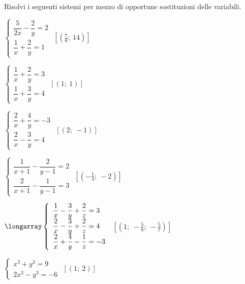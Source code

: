 \begin{esercizio}[\Ast]
 \label{ese:22.65}
 Risolvi i seguenti sistemi per mezzo di opportune sostituzioni delle variabili.
\begin{multicols}{2}
\begin{enumeratea}
{\longarray
\item $\left\{\begin{array}{l}
\dfrac{5}{2x}-\dfrac{2}{y}=2\\\dfrac{1}{x}+\dfrac{2}{y}=1
\end{array}\right.$
\hfill $\left[\left(\frac{7}{6};~14\right)\right]$
\item $\left\{\begin{array}{l}
\dfrac{1}{x}+\dfrac{2}{y}=3\\\dfrac{1}{x}+\dfrac{3}{y}=4
\end{array}\right.$
\hfill $\left[\left(1;~1\right)\right]$
\item $\left\{\begin{array}{l}
\dfrac{2}{x}+\dfrac{4}{y}=-3\\\dfrac{2}{x}-\dfrac{3}{y}=4 
\end{array}\right.$
\hfill $\left[\left(2;~-1\right)\right]$
\item $\left\{\begin{array}{l}
\dfrac{1}{x+1}-\dfrac{2}{y-1}=2\\\dfrac{2}{x+1}-\dfrac{1}{y-1}=3
\end{array}\right.$
\hfill $\left[\left(-{\frac{1}{4}};~-2\right)\right]$}
% 
\item $\longarray\left\{\begin{array}{l}
\dfrac{1}{x}-\dfrac{3}{y}+\dfrac{2}{z}=3 \\
\dfrac{2}{x}-\dfrac{3}{y}+\dfrac{2}{z}=4 \\
\dfrac{2}{x}+\dfrac{4}{y}-\dfrac{1}{z}=-3
\end{array}\right.$
\hfill $\left[\left(1;~-\frac{5}{8};~-\frac{5}{7}\right)\right]$
\item $\left\{\begin{array}{l}
x^{3}+y^{3}=9 \\2x^{3}-y^{3}=-6 
\end{array}\right.$
\hfill $\left[(1;~2)\right]$
\end{enumeratea}
\end{multicols}
\end{esercizio}

